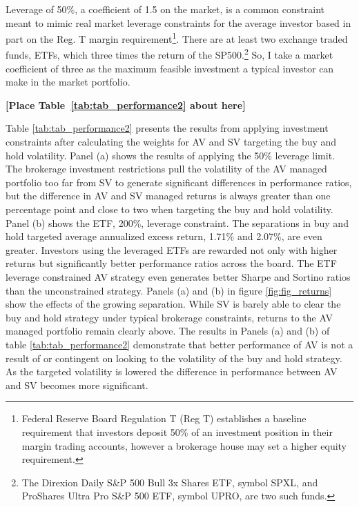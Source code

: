 Leverage of 50\%, a coefficient of 1.5 on the market, is a common constraint meant to mimic real market leverage constraints for the average investor based in part on the Reg. T margin requirement\footnote{Federal Reserve Board Regulation T (Reg T) establishes a baseline requirement that investors deposit 50\% of an investment position in their margin trading accounts, however a brokerage house may set a higher equity requirement.}. \citep{Campbell2008,Rapach2010,Rapach2013,Huang2015,Rapach2016,moreira_volatility-managed_2017,deuskar_margin_2017} There are at least two exchange traded funds, ETFs, which three times the return of the SP500.\footnote{The Direxion Daily S\&P 500 Bull 3x Shares ETF, symbol SPXL, and ProShares Ultra Pro S\&P 500 ETF, symbol UPRO, are two such funds.} So, I take a market coefficient of three as the maximum feasible investment a typical investor can make in the market portfolio. 
\bigskip
\centerline{\bf [Place Table~\ref{tab:tab_performance2} about here]}
\bigskip
Table \ref{tab:tab_performance2} presents the results from applying investment constraints after calculating the weights for AV and SV targeting the buy and hold volatility. Panel (a) shows the results of applying the 50\% leverage limit. The brokerage investment restrictions pull the volatility of the AV managed portfolio too far from SV to generate significant differences in performance ratios, but the difference in AV and SV managed returns is always greater than one percentage point and close to two when targeting the buy and hold volatility. Panel (b) shows the ETF, 200\%, leverage constraint. The separations in buy and hold targeted average annualized excess return, 1.71\% and 2.07\%, are even greater. Investors using the leveraged ETFs are rewarded not only with higher returns but significantly better performance ratios across the board. The ETF leverage constrained AV strategy even generates better Sharpe and Sortino ratios than the unconstrained strategy. Panels (a) and (b) in figure \ref{fig:fig_returns} show the effects of the growing separation. While SV is barely able to clear the buy and hold strategy under typical brokerage constraints, returns to the AV managed portfolio remain clearly above. The results in Panels (a) and (b) of table \ref{tab:tab_performance2} demonstrate that better performance of AV is not a result of or contingent on looking to the volatility of the buy and hold strategy. As the targeted volatility is lowered the difference in performance between AV and SV becomes more significant. %

